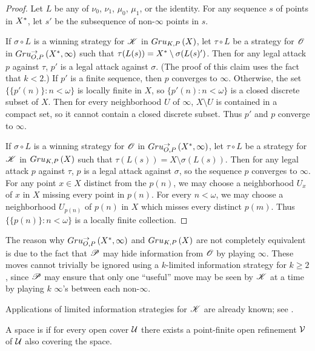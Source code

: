 \begin{proof}
  Let $L$ be any of $\nu_0$, $\nu_1$, $\mu_0$, $\mu_1$, or the identity.
  For any sequence $s$ of points in $X^*$, let $s'$ be the
  subsequence of non-$\infty$ points in $s$.

  If $\sigma\circ L$ is a winning strategy for $\mathscr{K}$ in $Gru_{K,P}\left({X}\right)$, let
  $\tau\circ L$ be a strategy for $\mathscr{O}$ in $Gru_{O,P}^{\to}\left({X^*},{\infty}\right)$
  such that $\tau(L(s)) = X^*\setminus \sigma(L(s)')$. Then for
  any legal attack $p$ against $\tau$, $p'$ is a legal attack against $\sigma$.
  (The proof of this claim uses the fact that $k<2$.)
  If $p'$ is a finite sequence, then $p$ converges to $\infty$.
  Otherwise, the set $\{\{p'(n)\}:n<\omega\}$ is locally finite in $X$, so
  $\{p'(n):n<\omega\}$ is a closed discrete subset of $X$. Then for every
  neighborhood $U$ of $\infty$, $X\setminus U$ is contained in a compact set,
  so it cannot contain a closed discrete subset. Thus $p'$ and $p$
  converge to $\infty$.

  If $\sigma\circ L$ is a winning strategy for $\mathscr{O}$ in
  $Gru_{O,P}^{\to}\left({X^*},{\infty}\right)$, let $\tau\circ L$ be a strategy for
  $\mathscr{K}$ in $Gru_{K,P}\left({X}\right)$ such that $\tau(L(s))= X\setminus\sigma(L(s))$.
  Then for any legal attack $p$ against $\tau$, $p$ is a legal attack against
  $\sigma$, so the sequence $p$ converges to $\infty$. For any point $x\in X$
  distinct from the $p(n)$, we may choose a neighborhood $U_x$ of $x$ in $X$
  missing every point in $p(n)$.
  For every $n<\omega$, we may choose a neighborhood $U_{p(n)}$ of $p(n)$ in
  $X$ which misses every distinct $p(m)$. Thus $\{\{p(n)\}:n<\omega\}$ is a
  locally finite collection.
\end{proof}

The reason why $Gru_{O,P}^{\to}\left({X^*},{\infty}\right)$ and $Gru_{K,P}\left({X}\right)$ are
not completely equivalent is due to the fact that $\mathscr{P}$ may hide information
from $\mathscr{O}$ by playing $\infty$. These moves cannot trivially be ignored
using a $k$-limited information strategy for $k\geq 2$, since $\mathscr{P}$ may
ensure that only one ``useful'' move may be seen by $\mathscr{K}$ at a time by playing
$k$ $\infty$'s between each non-$\infty$.

Applications of limited information strategies for $\mathscr{K}$ are already known;
see \cite{MR858337}.

\begin{defn}
  A space is  if for every open cover $\mathcal{U}$ there exists a
  point-finite open refinement $\mathcal{V}$ of $\mathcal{U}$ also covering the space.
\end{defn}

